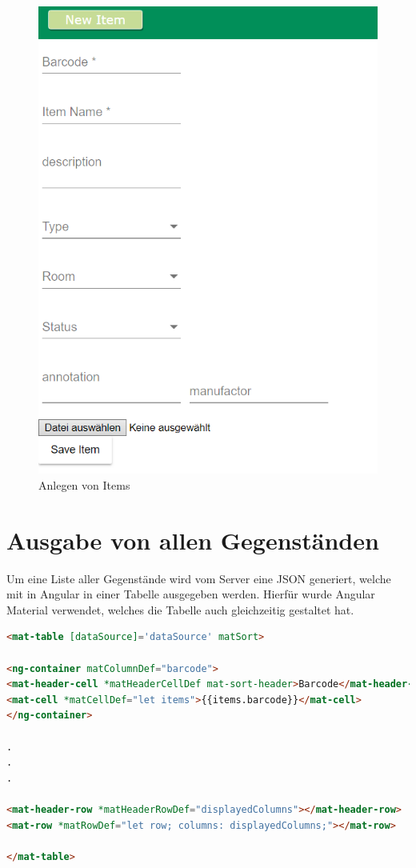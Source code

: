 \begin{figure}[H]
	\centering
	\includegraphics[scale=0.5]{content/pictures/item.png}
	\caption{Anlegen von Items}
	\label{fig:item}
\end{figure}

\section{Ausgabe von allen Gegenständen}
Um eine Liste aller Gegenstände wird vom Server eine \ac{JSON} generiert, welche mit in Angular in einer Tabelle ausgegeben werden. Hierfür wurde Angular Material verwendet, welches die Tabelle auch gleichzeitig gestaltet hat.

\begin{lstlisting}[language=html, frame=single]
<mat-table [dataSource]='dataSource' matSort>

<ng-container matColumnDef="barcode">
<mat-header-cell *matHeaderCellDef mat-sort-header>Barcode</mat-header-cell>
<mat-cell *matCellDef="let items">{{items.barcode}}</mat-cell>
</ng-container>

.
.
.

<mat-header-row *matHeaderRowDef="displayedColumns"></mat-header-row>
<mat-row *matRowDef="let row; columns: displayedColumns;"></mat-row>

</mat-table>
\end{lstlisting}


